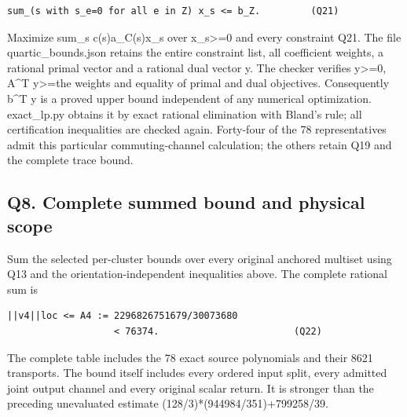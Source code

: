 \documentclass[11pt,a4paper]{article}
\renewcommand{\[}{\begingroup\small\originaldisplaystart}
\renewcommand{\]}{\originaldisplayend\endgroup}
\begin{document}
\begin{verbatim}
sum_(s with s_e=0 for all e in Z) x_s <= b_Z.         (Q21)
\end{verbatim}

Maximize sum\_s c(s)\textbar a\_C(s)\textbar x\_s over
x\_s\textgreater=0 and every constraint Q21. The file
{\ttfamily q\allowbreak{}u\allowbreak{}a\allowbreak{}r\allowbreak{}t\allowbreak{}i\allowbreak{}c\allowbreak{}\_\allowbreak{}b\allowbreak{}o\allowbreak{}u\allowbreak{}n\allowbreak{}d\allowbreak{}s\allowbreak{}.\allowbreak{}j\allowbreak{}s\allowbreak{}o\allowbreak{}n\allowbreak{}}
retains the entire constraint list, all coefficient weights, a rational
primal vector and a rational dual vector y. The checker verifies
y\textgreater=0, A\^{}T y\textgreater=the weights and equality of primal
and dual objectives. Consequently b\^{}T y is a proved upper bound
independent of any numerical optimization.
{\ttfamily e\allowbreak{}x\allowbreak{}a\allowbreak{}c\allowbreak{}t\allowbreak{}\_\allowbreak{}l\allowbreak{}p\allowbreak{}.\allowbreak{}p\allowbreak{}y\allowbreak{}}
obtains it by exact rational elimination with Bland's rule; all
certification inequalities are checked again. Forty-four of the 78
representatives admit this particular commuting-channel calculation; the
others retain Q19 and the complete trace bound.

\subsection{Q8. Complete summed bound and physical
scope}\label{q8.-complete-summed-bound-and-physical-scope}

Sum the selected per-cluster bounds over every original anchored
multiset using Q13 and the orientation-independent inequalities above.
The complete rational sum is

\begin{verbatim}
||v4||loc <= A4 := 2296826751679/30073680
                   < 76374.                        (Q22)
\end{verbatim}

The complete table includes the 78 exact source polynomials and their
8621 transports. The bound itself includes every ordered input split,
every admitted joint output channel and every original scalar return. It
is stronger than the preceding unevaluated estimate
{\ttfamily (\allowbreak{}1\allowbreak{}2\allowbreak{}8\allowbreak{}/\allowbreak{}3\allowbreak{})\allowbreak{}*\allowbreak{}(\allowbreak{}9\allowbreak{}4\allowbreak{}4\allowbreak{}9\allowbreak{}8\allowbreak{}4\allowbreak{}/\allowbreak{}3\allowbreak{}5\allowbreak{}1\allowbreak{})\allowbreak{}+\allowbreak{}7\allowbreak{}9\allowbreak{}9\allowbreak{}2\allowbreak{}5\allowbreak{}8\allowbreak{}/\allowbreak{}3\allowbreak{}9\allowbreak{}}.
\end{document}

